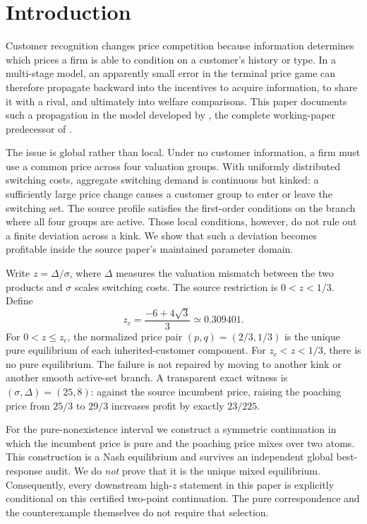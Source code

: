 \section{Introduction}\label{sec:intro}

Customer recognition changes price competition because information determines which prices a firm is able to condition on a customer's history or type. In a multi-stage model, an apparently small error in the terminal price game can therefore propagate backward into the incentives to acquire information, to share it with a rival, and ultimately into welfare comparisons. This paper documents such a propagation in the model developed by \citet{ShyStenbacka2012}, the complete working-paper predecessor of \citet{ShyStenbacka2013}.

The issue is global rather than local. Under no customer information, a firm must use a common price across four valuation groups. With uniformly distributed switching costs, aggregate switching demand is continuous but kinked: a sufficiently large price change causes a customer group to enter or leave the switching set. The source profile satisfies the first-order conditions on the branch where all four groups are active. Those local conditions, however, do not rule out a finite deviation across a kink. We show that such a deviation becomes profitable inside the source paper's maintained parameter domain.

Write \(z=\Delta/\sigma\), where \(\Delta\) measures the valuation mismatch between the two products and \(\sigma\) scales switching costs. The source restriction is \(0<z<1/3\). Define
\[
 z_c=\frac{-6+4\sqrt 3}{3}\simeq0.309401.
\]
For \(0<z\le z_c\), the normalized price pair \((p,q)=(2/3,1/3)\) is the unique pure equilibrium of each inherited-customer component. For \(z_c<z<1/3\), there is no pure equilibrium. The failure is not repaired by moving to another kink or another smooth active-set branch. A transparent exact witness is \((\sigma,\Delta)=(25,8)\): against the source incumbent price, raising the poaching price from \(25/3\) to \(29/3\) increases profit by exactly \(23/225\).

For the pure-nonexistence interval we construct a symmetric continuation in which the incumbent price is pure and the poaching price mixes over two atoms. This construction is a Nash equilibrium and survives an independent global best-response audit. We do \emph{not} prove that it is the unique mixed equilibrium. Consequently, every downstream high-\(z\) statement in this paper is explicitly conditional on this certified two-point continuation. The pure correspondence and the counterexample themselves do not require that selection.

